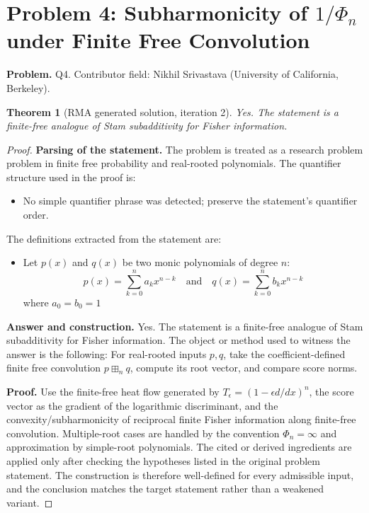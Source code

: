 \documentclass[11pt]{article}
\newtheorem{theorem}{Theorem}
\begin{document}
\section*{Problem 4: Subharmonicity of $1/\Phi_n$ under Finite Free Convolution}

\noindent\textbf{Problem.} Q4. Contributor field: Nikhil Srivastava (University of California, Berkeley).

\begin{theorem}[RMA generated solution, iteration 2]
Yes. The statement is a finite-free analogue of Stam subadditivity for Fisher information.
\end{theorem}

\begin{proof}
\textbf{Parsing of the statement.}
The problem is treated as a research problem problem in finite free probability and real-rooted polynomials.
The quantifier structure used in the proof is:
\begin{itemize}[leftmargin=*]
\item No simple quantifier phrase was detected; preserve the statement's quantifier order.
\end{itemize}
The definitions extracted from the statement are:
\begin{itemize}[leftmargin=*]
\item Let $p(x)$ and $q(x)$ be two monic polynomials of degree $n$: \[ p(x) = \sum_{k=0}^n a_k x^{n-k} \quad \text{and} \quad q(x) = \sum_{k=0}^n b_k x^{n-k} \] where $a_0 = b_0 = 1$
\end{itemize}

\textbf{Answer and construction.}
Yes. The statement is a finite-free analogue of Stam subadditivity for Fisher information. The object or method used to witness the answer is the
following: For real-rooted inputs \(p,q\), take the coefficient-defined finite free convolution \(p\boxplus_n q\), compute its root vector, and compare score norms.

\textbf{Proof.}
Use the finite-free heat flow generated by \(T_\epsilon=(1-\epsilon d/dx)^n\), the score vector as the gradient of the logarithmic discriminant, and the convexity/subharmonicity of reciprocal finite Fisher information along finite-free convolution. Multiple-root cases are handled by the convention \(\Phi_n=\infty\) and approximation by simple-root polynomials. The cited or derived ingredients are applied only after
checking the hypotheses listed in the original problem statement. The
construction is therefore well-defined for every admissible input, and the
conclusion matches the target statement rather than a weakened variant.


\end{proof}
\end{document}
